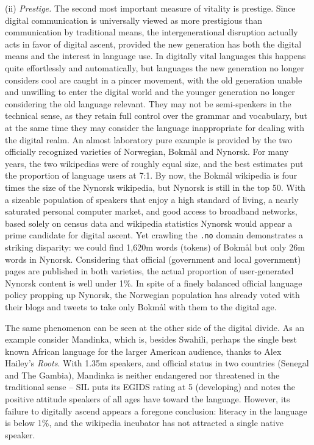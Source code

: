\documentclass[10pt]{article}
\begin{document}
\bigskip
(ii) {\it Prestige.} The second most important measure of vitality is
prestige. Since digital communication is universally viewed as more
prestigious than communication by traditional means, the intergenerational
disruption actually acts in favor of digital {\color{black} ascent}, provided the new
generation has both the digital means and the interest in language use. In
digitally vital languages this happens quite effortlessly and automatically,
but languages the new generation no longer considers cool are caught in a
pincer movement, with the old generation unable and unwilling to enter the
digital world and the younger generation no longer considering the old
language relevant. They may not be semi-speakers in the technical sense, as
they retain full control over the grammar and vocabulary, but at the same time
they may consider the language inappropriate for dealing with the digital
realm. An almost laboratory pure example is provided by the two officially
recognized varieties of Norwegian, Bokm\aa l and Nynorsk. For many years, the
two wikipedias were of roughly equal size, and the best estimates \cite{Rehm:2012}
put the proportion of language users at 7:1. By now, the Bokm\aa l wikipedia
is four times the size of the Nynorsk wikipedia, but Nynorsk is still in the
top 50. With a sizeable population of speakers that enjoy a high standard of
living, a nearly saturated personal computer market, and good access to
broadband networks, based solely on census data and wikipedia statistics
Nynorsk would appear a prime candidate for {\color{black} digital ascent}.  Yet
crawling the {\tt .no} domain demonstrates a striking disparity: we could find
1,620m words {\color{black} (tokens)} of Bokm\aa l but only 26m words in
Nynorsk. Considering that official (government and local government) pages are
published in both varieties, the actual proportion of user-generated Nynorsk
content is well under 1\%. In spite of a finely balanced official language
policy propping up Nynorsk, the Norwegian population has already voted with
their blogs and tweets to take only Bokm\aa l with them to the digital age.

The same phenomenon can be seen at the other side of the digital divide.  As
an example consider Mandinka, {\color{black} which is, besides Swahili,}
perhaps the single best known African language for the larger American
audience, thanks to Alex Hailey's {\it Roots}. With 1.35m speakers, and
official status in two countries (Senegal and The Gambia), Mandinka is neither
endangered nor threatened in the traditional sense -- SIL puts its EGIDS
rating at 5 (developing) and notes the positive attitude speakers of all ages
have toward the language.  However, its {\color{black} failure to digitally
  ascend} appears a foregone conclusion: literacy in the language is below
1\%, and the wikipedia incubator \cite{MandIncu}
has not attracted a single native speaker.
\end{document}
